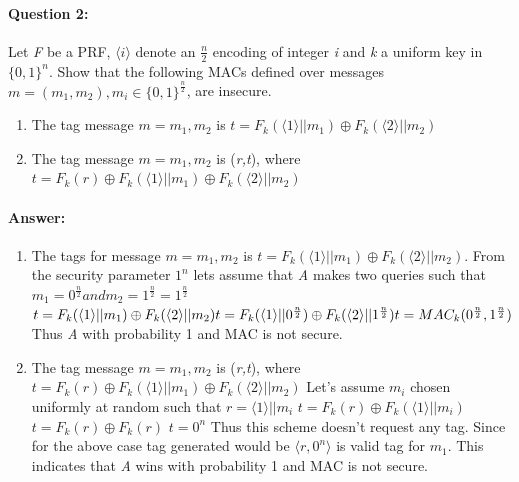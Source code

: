 \documentclass{article}
\begin{document}
    \paragraph{Question 2:} Let \emph{F} be a PRF, $\langle i \rangle$ denote an $\frac{n}{2}$ encoding of integer \emph{i} and \emph{k} a uniform key in ${\{0,1\}}^n$. Show that the following MACs defined over messages $m=(m_1,m_2), m_i \in {\{0,1\}}^{\frac{n}{2}}$, are insecure.
        \begin{enumerate}
            \item The tag message $m = m_1,m_2$ is $t={F_k}(\langle 1 \rangle || {m_1}) \oplus {F_k}(\langle 2 \rangle || {m_2})$
            \item The tag message $m = m_1,m_2$ is (\emph{r,t}), where $t={F_k}(r)\oplus {F_k}(\langle 1 \rangle || {m_1}) \oplus {F_k}(\langle 2 \rangle || {m_2})$
        \end{enumerate}
        
    \paragraph{Answer: \newline}
        \begin{enumerate}
            \item
                The tags for message $m=m_1,m_2$ is $t={F_k}(\langle 1 \rangle || {m_1}) \oplus {F_k}(\langle 2 \rangle || {m_2})$. From the security parameter $1^n$ lets assume that \emph{A} makes two queries such that $m_1 = 0^{\frac{n}{2}} and m_2 = 1^{\frac{n}{2}} = 1^\frac{n}{2}$
                \begin{math}                
                    t={F_k}(\langle 1 \rangle || {m_1}) \oplus {F_k}(\langle 2 \rangle || {m_2})\newline
                    t={F_k}(\langle 1 \rangle || 0^\frac{n}{2}) \oplus {F_k}(\langle 2 \rangle || 1^\frac{n}{2})\newline
                    t=MAC_k(0^\frac{n}{2},1^\frac{n}{2})
                \end{math}
                Thus \emph{A} with probability 1 and MAC is not secure.
                
            \item
                The tag message $m = m_1,m_2$ is (\emph{r,t}), where $t={F_k}(r)\oplus {F_k}(\langle 1 \rangle || {m_1}) \oplus {F_k}(\langle 2 \rangle || {m_2})$
                Let's assume $m_i$ chosen uniformly at random such that $r=\langle1\rangle||m_i$\newline
                $t=F_k(r)\oplus{F_k(\langle1\rangle||m_i)}$\newline
                $t=F_k(r)\oplus{F_k(r)}$\newline
                $t=0^n$
                Thus this scheme doesn't request any tag. Since for the above case tag generated would be $\langle r, 0^n\rangle$ is valid tag for $m_1$. This indicates that \emph{A} wins with probability 1 and MAC is not secure.
        \end{enumerate}
    
\end{document}
